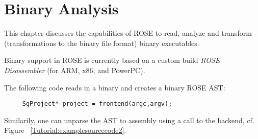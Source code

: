 \chapter{Binary Analysis}

This chapter discusses the capabilities of ROSE to read, analyze and transform 
(transformations to the binary file format) binary executables.

Binary support in ROSE is currently based on a custom build \emph{ROSE Disassembler} (for ARM, x86, and PowerPC).

The following code reads in a binary and creates a binary ROSE AST:

{\mySmallFontSize
\begin{verbatim}
     SgProject* project = frontend(argc,argv);
\end{verbatim}
}

Similarily, one can unparse the AST to assembly using a call to the backend, cf. Figure ~\ref{Tutorial:examplesourcecode2}.












